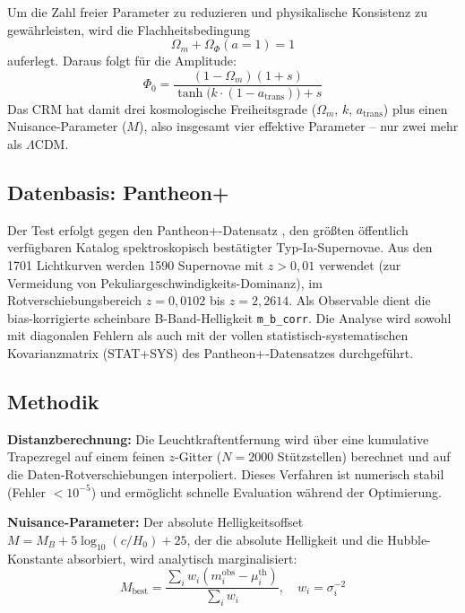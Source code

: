 \documentclass[aps,prd,twocolumn,superscriptaddress,nofootinbib]{revtex4-2}
\begin{document}
Um die Zahl freier Parameter zu reduzieren und physikalische Konsistenz zu gew\"ahrleisten, wird die Flachheitsbedingung
\begin{equation}
\Omega_m + \Omega_\Phi(a{=}1) = 1
\label{eq:flatness}
\end{equation}
auferlegt. Daraus folgt f\"ur die Amplitude:
\begin{equation}
\Phi_0 = \frac{(1 - \Omega_m)(1 + s)}{\tanh\!\big(k\cdot(1 - a_{\mathrm{trans}})\big) + s}
\end{equation}
Das CRM hat damit drei kosmologische Freiheitsgrade ($\Omega_m$, $k$, $a_{\mathrm{trans}}$) plus einen Nuisance-Parameter ($M$), also insgesamt vier effektive Parameter -- nur zwei mehr als $\Lambda$CDM.

\subsection{Datenbasis: Pantheon+}
\label{subsec:pantheonplus}

Der Test erfolgt gegen den Pantheon+-Datensatz \cite{Scolnic2022}, den gr\"o\ss{}ten \"offentlich verf\"ugbaren Katalog spektroskopisch best\"atigter Typ-Ia-Supernovae. Aus den 1701 Lichtkurven werden 1590 Supernovae mit $z > 0{,}01$ verwendet (zur Vermeidung von Pekuliargeschwindigkeits-Dominanz), im Rotverschiebungsbereich $z = 0{,}0102$ bis $z = 2{,}2614$. Als Observable dient die bias-korrigierte scheinbare B-Band-Helligkeit \texttt{m\_b\_corr}. Die Analyse wird sowohl mit diagonalen Fehlern als auch mit der vollen statistisch-systematischen Kovarianzmatrix (STAT+SYS) des Pantheon+-Datensatzes durchgef\"uhrt.

\subsection{Methodik}
\label{subsec:methodik}

\textbf{Distanzberechnung:} Die Leuchtkraftentfernung wird \"uber eine kumulative Trapezregel auf einem feinen $z$-Gitter ($N = 2000$ St\"utzstellen) berechnet und auf die Daten-Rotverschiebungen interpoliert. Dieses Verfahren ist numerisch stabil (Fehler $< 10^{-5}$) und erm\"oglicht schnelle Evaluation w\"ahrend der Optimierung.

\textbf{Nuisance-Parameter:} Der absolute Helligkeitsoffset $M = M_B + 5\log_{10}(c/H_0) + 25$, der die absolute Helligkeit und die Hubble-Konstante absorbiert, wird analytisch marginalisiert:
\begin{equation}
M_{\mathrm{best}} = \frac{\sum_i w_i (m_i^{\mathrm{obs}} - \mu_i^{\mathrm{th}})}{\sum_i w_i}, \quad w_i = \sigma_i^{-2}
\end{equation}
\end{document}
